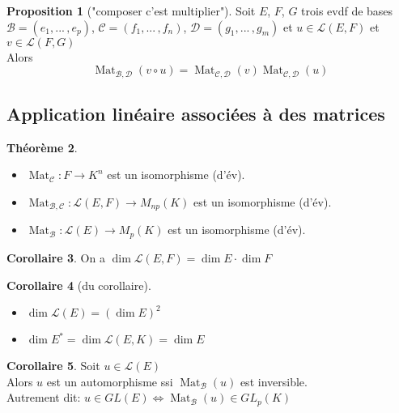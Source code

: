 \documentclass[10pt,a4paper]{article}
\theoremstyle{definition}
\newtheorem{proposition}{Proposition}[section]
\newtheorem{theorem}[proposition]{Théorème}
\newtheorem{corollaire}[proposition]{Corollaire}
\DeclareMathOperator{\Mat}{Mat}
\begin{document}
\begin{proposition}["composer c'est multiplier"]
Soit $E$, $F$, $G$ trois evdf de bases \\
$\mathcal{B} = (e_1, ...\, , e_p)$, $\mathcal{C} = (f_1, ...\, , f_n)$, $\left. \mathcal{D} = (g_1, ...\, , g_m) \right.$ et $u \in \mathcal{L}(E, F)$ et $v \in \mathcal{L}(F, G)$ \\
Alors
\[\Mat_{\mathcal{B}, \mathcal{D}}(v \circ u) = \Mat_{\mathcal{C}, \mathcal{D}}(v) \Mat_{\mathcal{C}, \mathcal{D}}(u)\]
\end{proposition}

\subsection{Application linéaire associées à des matrices}
\begin{theorem}
\hfill
\begin{itemize}
\item $\Mat_\mathcal{C} : F \to K^n$ est un isomorphisme (d'év).
\item $\Mat_{\mathcal{B}, \mathcal{C}} : \mathcal{L}(E, F) \to M_{np}(K)$ est un isomorphisme (d'év).
\item $\Mat_\mathcal{B} : \mathcal{L}(E) \to M_p(K)$ est un isomorphisme (d'év).
\end{itemize}
\end{theorem}
\begin{corollaire}
On a $\dim \mathcal{L}(E, F) =  \dim E \cdot \dim F$
\end{corollaire}
\begin{corollaire}[du corollaire]
\hfill
\begin{itemize}
\item $\dim \mathcal{L}(E) = (\dim E)^2$
\item $\dim E^* = \dim \mathcal{L}(E, K) = \dim E$
\end{itemize}
\end{corollaire}
\begin{corollaire}
Soit $u \in \mathcal{L}(E)$ \\
Alors $u$ est un automorphisme ssi $\Mat_\mathcal{B}(u)$ est inversible. \\
Autrement dit: $u \in GL(E) \iff \Mat_\mathcal{B}(u) \in GL_p(K)$
\end{corollaire}
\end{document}

